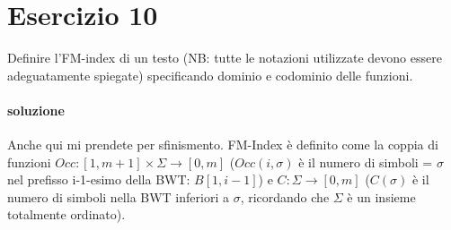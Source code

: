 \section{Esercizio 10}

Definire l'FM-index di un testo (NB: tutte le notazioni utilizzate devono essere adeguatamente spiegate) specificando dominio e codominio delle funzioni.

\paragraph{soluzione}

Anche qui mi prendete per sfinismento. FM-Index \`e definito come la coppia di funzioni $Occ : [1, m+1] \times \Sigma \rightarrow [0, m]$ ($Occ(i, \sigma)$ \`e il numero di simboli = $\sigma$ nel prefisso i-1-esimo della BWT: $B[1,i-1]$) e $C : \Sigma \rightarrow [0,m]$ ($C(\sigma)$ \`e il numero di simboli nella BWT inferiori a $\sigma$, ricordando che $\Sigma$ \`e un insieme totalmente ordinato).
